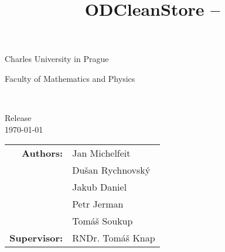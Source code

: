 \title{ODCleanStore -- \documentname}

\begin{titlepage}
\begin{center}

\large
Charles University in Prague

\smallskip

Faculty of Mathematics and Physics



\\
\medskip
{}


\begin{spacing}{1.5} 
{\bf\Huge \documentname}
\end{spacing}

Release \version\\
\today


\begin{tabular}{rl}

\textbf{Authors:} & Jan Michelfeit \\
& Du\v san Rychnovsk\'y\\
& Jakub Daniel\\
& Petr Jerman\\
& Tom\' a\v s Soukup\\
\noalign{\vspace{3mm}}
\textbf{Supervisor:} & RNDr. Tom\' a\v s Knap
\end{tabular}

\end{center}
\end{titlepage}

\newpage
\thispagestyle{empty}